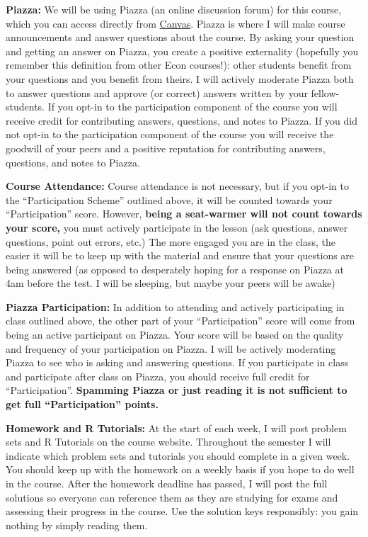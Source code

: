 \documentclass[11pt, letterpaper]{article}
\begin{document}
\noindent \textbf{Piazza:} 
We will be using Piazza (an online discussion forum) for this course, which you can access directly from \href{http://upenn.instructure.com}{Canvas}. 
Piazza is where I will make course announcements and answer questions about the course.
By asking your question and getting an answer on Piazza, you create a positive externality (hopefully you remember this definition from other Econ courses!): other students benefit from your questions and you benefit from theirs. 
I will actively moderate Piazza both to answer questions and approve (or correct) answers written by your fellow-students.
If you opt-in to the participation component of the course you will receive credit for contributing answers, questions, and notes to Piazza. 
If you did not opt-in to the participation component of the course you will receive the goodwill of your peers and a positive reputation for contributing answers, questions, and notes to Piazza. 

\medskip

\noindent \textbf{Course Attendance:}
Course attendance is not necessary, but if you opt-in to the ``Participation Scheme'' outlined above, it will be counted towards your ``Participation'' score. 
However, \textbf{being a seat-warmer will not count towards your score,} you must actively participate in the lesson (ask questions, answer questions, point out errors, etc.)
The more engaged you are in the class, the easier it will be to keep up with the material and ensure that your questions are being answered (as opposed to desperately hoping for a response on Piazza at 4am before the test. I will be sleeping, but maybe your peers will be awake)

\medskip

\noindent \textbf{Piazza Participation:}
In addition to attending and actively participating in class outlined above, the other part of your ``Participation'' score will come from being an active participant on Piazza. Your score will be based on the quality and frequency of your participation on Piazza. I will be actively moderating Piazza to see who is asking and answering questions. If you participate in class and participate after class on Piazza, you should receive full credit for ``Participation''. \textbf{Spamming Piazza or just reading it is not sufficient to get full ``Participation'' points.}

\medskip 

\noindent \textbf{Homework and R Tutorials:} 
At the start of each week, I will post problem sets and R Tutorials on the course website.
Throughout the semester I will indicate which problem sets and tutorials you should complete in a given week.
You should keep up with the homework on a weekly basis if you hope to do well in the course.
After the homework deadline has passed, I will post the full solutions so everyone can reference them as they are studying for exams and assessing their progress in the course.
Use the solution keys responsibly: you gain nothing by simply reading them.
\end{document}
